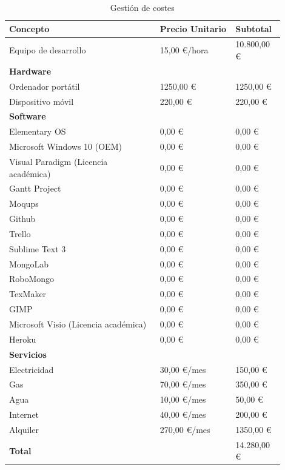 	\begin{table}[H]
	  \centering 
	  \begin{tabular}{p{0.5\linewidth}p{0.25\linewidth}p{0.15\linewidth}}
	  	\multicolumn{1}{l}{\cellcolor{black!30}\textbf{Concepto}} &
	    \multicolumn{1}{l}{\cellcolor{black!30}\textbf{Precio Unitario}} & 
	 	\multicolumn{1}{l}{\cellcolor{black!30}\textbf{Subtotal}}
	 	\\	 
	    \toprule
		Equipo de desarrollo 					&	15,00 \euro /hora	&	10.800,00 \euro	\\
		
		\multicolumn{3}{l}{\cellcolor{black!30}\textbf{Hardware}}						\\			
		Ordenador portátil						&	1250,00 \euro		&	1250,00 \euro	\\
		Dispositivo móvil						&	220,00 \euro		&	220,00 \euro	\\

		\multicolumn{3}{l}{\cellcolor{black!30}\textbf{Software}}						\\
		Elementary OS							&	0,00 \euro			&	0,00 \euro	\\
		Microsoft Windows 10 (\ac{OEM})		&	0,00 \euro			&	0,00	\euro	\\
		Visual Paradigm	(Licencia académica)	&	0,00 \euro			&	0,00 \euro	\\
		Gantt Project							&	0,00 \euro			&	0,00 \euro	\\
		Moqups									&	0,00 \euro			&	0,00 \euro	\\
		Github									&	0,00 \euro			&	0,00	\euro	\\
		Trello									&	0,00 \euro			&	0,00 \euro	\\
		Sublime Text 3							&	0,00 \euro			&	0,00 \euro	\\
		MongoLab								&	0,00 \euro			&	0,00 \euro	\\
		RoboMongo								&	0,00 \euro			&	0,00 \euro	\\
		TexMaker								&	0,00 \euro			&	0,00 \euro	\\
		GIMP									&	0,00 \euro			&	0,00 \euro	\\
		Microsoft Visio	(Licencia académica)	&	0,00 \euro			&	0,00 \euro	\\
		Heroku									&	0,00 \euro			&	0,00	\euro	\\

		\multicolumn{3}{l}{\cellcolor{black!30}\textbf{Servicios}}						\\			
		Electricidad							&	30,00 \euro	/mes	&	150,00	\euro	\\
		Gas										&	70,00 \euro /mes	&	350,00 \euro	\\
		Agua									&	10,00 \euro	/mes	&	50,00 \euro	\\
		Internet								&	40,00 \euro	/mes	&	200,00 \euro	\\
		Alquiler								&	270,00 \euro /mes	&	1350,00 \euro	\\
		\textbf{Total} 							&						&	14.280,00 \euro	\\
	    \hline
	  \end{tabular}
	  \caption{Gestión de costes}
	  \label{tab:costes}
	\end{table}


